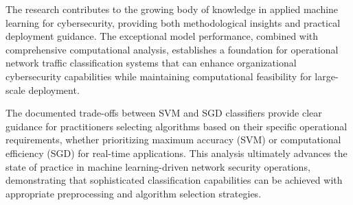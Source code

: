 \documentclass[12pt,a4paper]{article}
\begin{document}
The research contributes to the growing body of knowledge in applied machine learning for cybersecurity, providing both methodological insights and practical deployment guidance. The exceptional model performance, combined with comprehensive computational analysis, establishes a foundation for operational network traffic classification systems that can enhance organizational cybersecurity capabilities while maintaining computational feasibility for large-scale deployment.

The documented trade-offs between SVM and SGD classifiers provide clear guidance for practitioners selecting algorithms based on their specific operational requirements, whether prioritizing maximum accuracy (SVM) or computational efficiency (SGD) for real-time applications. This analysis ultimately advances the state of practice in machine learning-driven network security operations, demonstrating that sophisticated classification capabilities can be achieved with appropriate preprocessing and algorithm selection strategies.
\end{document}

